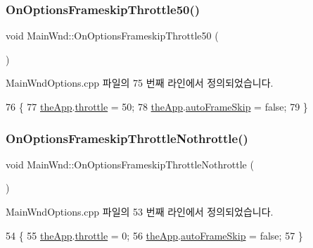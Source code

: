 \subsubsection{\texorpdfstring{On\+Options\+Frameskip\+Throttle50()}{OnOptionsFrameskipThrottle50()}}
{\footnotesize\ttfamily void Main\+Wnd\+::\+On\+Options\+Frameskip\+Throttle50 (\begin{DoxyParamCaption}{ }\end{DoxyParamCaption})\hspace{0.3cm}{\ttfamily [protected]}}



Main\+Wnd\+Options.\+cpp 파일의 75 번째 라인에서 정의되었습니다.


\begin{DoxyCode}
76 \{
77   \mbox{\hyperlink{_v_b_a_8cpp_a8095a9d06b37a7efe3723f3218ad8fb3}{theApp}}.\mbox{\hyperlink{class_v_b_a_af21b98509a2589b38e4787f065b40a2b}{throttle}} = 50;  
78   \mbox{\hyperlink{_v_b_a_8cpp_a8095a9d06b37a7efe3723f3218ad8fb3}{theApp}}.\mbox{\hyperlink{class_v_b_a_a9ecbee7d82db73b24aee3afb66128388}{autoFrameSkip}} = \textcolor{keyword}{false};
79 \}
\end{DoxyCode}
\mbox{\label{class_main_wnd_a54d38aa98017f7e37c6b8938a480b9ce}} 
\subsubsection{\texorpdfstring{On\+Options\+Frameskip\+Throttle\+Nothrottle()}{OnOptionsFrameskipThrottleNothrottle()}}
{\footnotesize\ttfamily void Main\+Wnd\+::\+On\+Options\+Frameskip\+Throttle\+Nothrottle (\begin{DoxyParamCaption}{ }\end{DoxyParamCaption})\hspace{0.3cm}{\ttfamily [protected]}}



Main\+Wnd\+Options.\+cpp 파일의 53 번째 라인에서 정의되었습니다.


\begin{DoxyCode}
54 \{
55   \mbox{\hyperlink{_v_b_a_8cpp_a8095a9d06b37a7efe3723f3218ad8fb3}{theApp}}.\mbox{\hyperlink{class_v_b_a_af21b98509a2589b38e4787f065b40a2b}{throttle}} = 0;  
56   \mbox{\hyperlink{_v_b_a_8cpp_a8095a9d06b37a7efe3723f3218ad8fb3}{theApp}}.\mbox{\hyperlink{class_v_b_a_a9ecbee7d82db73b24aee3afb66128388}{autoFrameSkip}} = \textcolor{keyword}{false};
57 \}
\end{DoxyCode}
\mbox{\label{class_main_wnd_ae29a4d47a221049a8fbdc820ea6fffa9}} 
